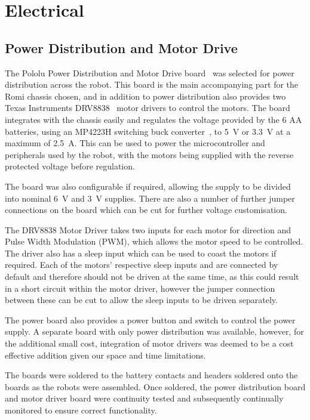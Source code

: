 
\chapter{Electrical}\label{electrical}

\section{Power Distribution and Motor Drive}\label{elec/poweranddrive}
The Pololu Power Distribution and Motor Drive board~\cite{pololupower}
was selected for power distribution across
the robot. This board is the main accompanying part for the Romi
chassis chosen, and in addition to power distribution also provides
two Texas Instruments DRV8838~\cite{texasdrivers} motor drivers to control
the motors. The board integrates with the chassis easily
and regulates the voltage provided by the 6 AA batteries, using an
MP4223H switching buck converter~\cite{mpbuck}, to \SI{5}{\volt} or
\SI{3.3}{\volt} at a maximum of \SI{2.5}{\ampere}. This can be used
to power the microcontroller and peripherals used by the robot, with the
motors being supplied with the reverse protected voltage before regulation.

The board was also configurable if required, allowing the supply to be
divided into nominal \SI{6}{\volt} and \SI{3}{\volt} supplies. There are also a number of further jumper
connections on the board which can be cut for further voltage customisation.

The DRV8838 Motor Driver takes two inputs for each motor for direction and Pulse
Width Modulation (PWM), which allows the motor speed to be controlled. The
driver also has a sleep input which can be used to coast the motors if
required. Each of the motors' respective sleep inputs
and are connected by default and therefore should not be driven at the same time,
as this could result in a short circuit within the motor driver, however the
jumper connection between these can be cut to allow the sleep inputs to
be driven separately.

The power board also provides a power button and switch to control the
power supply. A separate board with only power distribution was
available, however, for the additional small cost, integration of
motor drivers was deemed to be a cost effective addition given our
space and time limitations.

The boards were soldered to the battery contacts and headers soldered
onto the boards as the robots were assembled. Once soldered, the power
distribution board and motor driver board were continuity tested and
subsequently continually monitored to ensure correct functionality.


